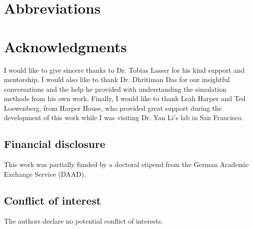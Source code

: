\documentclass[AMA,LATO1COL]{WileyNJD-v2}
\begin{document}
\maketitle








\glsaddall
\section*{Abbreviations}
\begin{multicols}{3}
\printglossary[type=\acronymtype, nonumberlist]
\end{multicols}

\section*{Acknowledgments}
I would like to give sincere thanks to Dr. Tobias Lasser for his kind support and mentorship. I would also like to thank Dr. Dhritiman Das for our insightful conversations and the help he provided with understanding the simulation methods from his own work. Finally, I would like to thank Leah Harper and Ted Loewenberg, from Harper House, who provided great support during the development of this work while I was visiting Dr. Yan Li's lab in San Francisco. 

\subsection*{Financial disclosure}
This work was partially funded by a doctoral stipend from the German Academic Exchange Service (DAAD).

\subsection*{Conflict of interest}
The authors declare no potential conflict of interests.

% 



\end{document}
